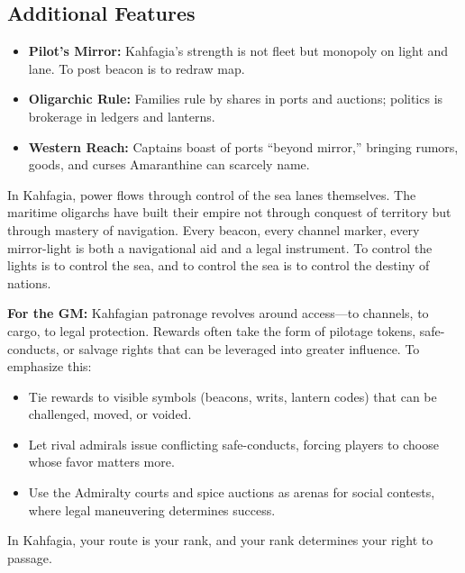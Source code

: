 \subsection*{Additional Features}
\begin{itemize}
\item \textbf{Pilot's Mirror:} Kahfagia's strength is not fleet but monopoly on light and lane. To post beacon is to redraw map.
\item \textbf{Oligarchic Rule:} Families rule by shares in ports and auctions; politics is brokerage in ledgers and lanterns.
\item \textbf{Western Reach:} Captains boast of ports ``beyond mirror,'' bringing rumors, goods, and curses Amaranthine can scarcely name.
\end{itemize}

\begin{tcolorbox}[colback=black!3,colframe=black!40!white,title={Patronage \& Power}]
In Kahfagia, power flows through control of the sea lanes themselves. The maritime oligarchs have built their empire not through conquest of territory but through mastery of navigation. Every beacon, every channel marker, every mirror-light is both a navigational aid and a legal instrument. To control the lights is to control the sea, and to control the sea is to control the destiny of nations. 

\textbf{For the GM:}  
Kahfagian patronage revolves around access---to channels, to cargo, to legal protection. Rewards often take the form of pilotage tokens, safe-conducts, or salvage rights that can be leveraged into greater influence. To emphasize this:
\begin{itemize}
\item Tie rewards to visible symbols (beacons, writs, lantern codes) that can be challenged, moved, or voided.
\item Let rival admirals issue conflicting safe-conducts, forcing players to choose whose favor matters more.
\item Use the Admiralty courts and spice auctions as arenas for social contests, where legal maneuvering determines success.
\end{itemize}
In Kahfagia, your route is your rank, and your rank determines your right to passage.
\end{tcolorbox}


